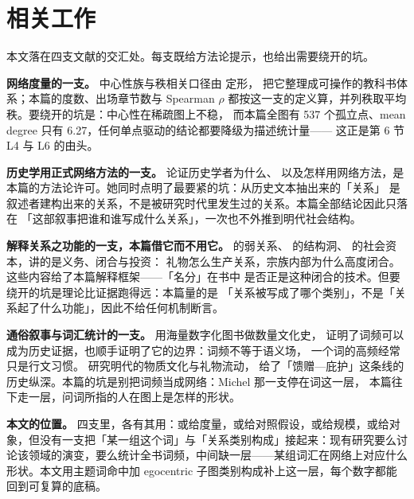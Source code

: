 \section{相关工作}

本文落在四支文献的交汇处。每支既给方法论提示，也给出需要绕开的坑。

\textbf{网络度量的一支。} 中心性族与秩相关口径由 \citet{freeman1978} 定形，
\citep{wasserman1994} 把它整理成可操作的教科书体系；本篇的度数、出场章节数与
Spearman $\rho$ 都按这一支的定义算，并列秩取平均秩。要绕开的坑是：中心性在稀疏图上不稳，
而本篇全图有 537 个孤立点、mean degree 只有 6.27，任何单点驱动的结论都要降级为描述统计量——
这正是第 6 节 L4 与 L6 的由头。

\textbf{历史学用正式网络方法的一支。} \citet{lemercier2015} 论证历史学者为什么、
以及怎样用网络方法，是本篇的方法论许可。她同时点明了最要紧的坑：从历史文本抽出来的「关系」
是叙述者建构出来的关系，不是被研究时代里发生过的关系。本篇全部结论因此只落在
「这部叙事把谁和谁写成什么关系」，一次也不外推到明代社会结构。

\textbf{解释关系之功能的一支，本篇借它而不用它。} \citet{granovetter1973} 的弱关系、
\citet{burt1992} 的结构洞、\citet{coleman1988} 的社会资本，讲的是义务、闭合与投资：
礼物怎么生产关系，宗族内部为什么高度闭合。这些内容给了本篇解释框架——「名分」在书中
是否正是这种闭合的技术。但要绕开的坑是理论比证据跑得远：本篇量的是
「关系被写成了哪个类别」，不是「关系起了什么功能」，因此不给任何机制断言。

\textbf{通俗叙事与词汇统计的一支。} \citet{michel2011} 用海量数字化图书做数量文化史，
证明了词频可以成为历史证据，也顺手证明了它的边界：词频不等于语义场，
一个词的高频经常只是行文习惯。\citet{brook1998} 研究明代的物质文化与礼物流动，
给了「馈赠—庇护」这条线的历史纵深。本篇的坑是别把词频当成网络：Michel 那一支停在词这一层，
本篇往下走一层，问词所指的人在图上是怎样的形状。

\textbf{本文的位置。} 四支里，各有其用：或给度量，或给对照假设，或给规模，或给对象，但没有一支把「某一组这个词」与「关系类别构成」接起来：现有研究要么讨论该领域的演变，要么统计全书词频，中间缺一层——某组词汇在网络上对应什么形状。本文用主题词命中加 egocentric 子图类别构成补上这一层，每个数字都能回到可复算的底稿。
